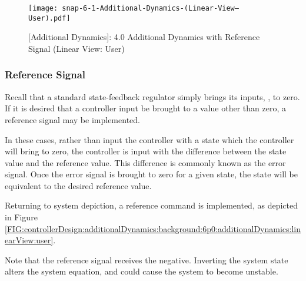 \documentclass[crop=false,float=true,class=scrreprt]{standalone}
\begin{document}
\begin{landscape}
\begin{figure}[H]%
\centering%
\begin{minipage}[c][0.995\textheight][c]{0.995\linewidth}%
\centering%
\texttt{[image: snap-6-1-Additional-Dynamics-(Linear-View---User).pdf]}%
\caption[{[Additional Dynamics]: 4.0 Additional Dynamics with Reference Signal (Linear View: User)}]%
        {{[Additional Dynamics]: 4.0 Additional Dynamics with Reference Signal (Linear View: User)%
          \label{FIG:controllerDesign:additionalDynamics:background:6p1:additionalDynamics:linearView:user}%
        }}%
\end{minipage}%
\end{figure}
\end{landscape}




\clearpage




\subsubsection{Reference Signal}
\label{SEC:controllerDesign:additionalDynamics:background:referenceSignal}


Recall that a standard state-feedback regulator 
simply brings its inputs, 
{},
to zero.
If it is desired that a controller input be brought to a value other than zero,
a reference signal may be implemented.

In these cases, 
rather than input the controller with a state which the controller will bring to zero,
the controller is input with 
the difference between the state value and the reference {} value.
This difference is commonly known as the error signal.
Once the error signal is brought to zero for a given state,
the state will be equivalent to the desired reference value.

Returning to system depiction,
a reference command is implemented,
as depicted in Figure~%
\ref{FIG:controllerDesign:additionalDynamics:background:6p0:additionalDynamics:linearView:user}.

Note that the reference signal receives the negative.
Inverting the system state alters the system equation,
and could cause the system to become unstable.
\end{document}
